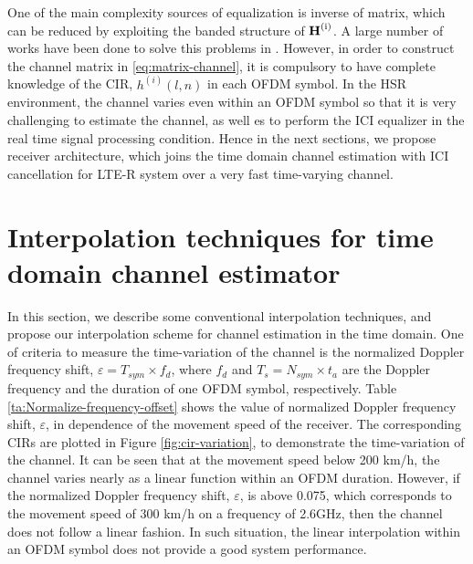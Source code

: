 \documentclass[12pt,journal,draftclsnofoot,onecolumn]{IEEEtran}
\begin{document}
One of the main complexity sources of equalization is inverse of matrix, which can be reduced by exploiting  the banded structure of $\rm{\textbf H^{(i)}}$. A large number of works have been done to solve this problems in \cite{Hsu2009, Liu2012, Schniter2004, Fang2007}. However, in order to construct the channel matrix in \eqref{eq:matrix-channel}, it is compulsory to have complete knowledge of the CIR, $h^{(i)}(l,n)$ in each OFDM symbol. In the HSR environment, the channel varies even within an OFDM symbol so that it is very challenging to estimate the channel, as well es to perform the ICI equalizer in the real time signal processing condition. Hence in the next sections, we propose receiver architecture, which joins the  time domain channel estimation with ICI cancellation for LTE-R system over a very fast time-varying channel.
	
\section{Interpolation techniques for time domain channel estimator}\label{section-3}
	
In this section, we describe some conventional interpolation techniques, and propose our interpolation scheme for channel estimation in the time domain. One of criteria to measure the time-variation of the channel is the normalized Doppler frequency shift, $\varepsilon = T_{sym}\times f_{d}$, where $f_{d}$ and $T_{s}=N_{sym}\times t_{a}$ are the Doppler frequency and the duration of one OFDM symbol, respectively. Table \ref{ta:Normalize-frequency-offset} shows the value of normalized Doppler frequency shift, $\varepsilon$, in dependence of the movement speed of the receiver. The corresponding CIRs are plotted in Figure \ref{fig:cir-variation}, to demonstrate the time-variation of the channel. It can be seen that at the movement speed below 200 km/h, the channel varies nearly as a linear function  within an OFDM duration. However,  if the normalized Doppler frequency shift, $\varepsilon$, is above 0.075, which corresponds to the movement speed of 300 km/h on a frequency of 2.6GHz, then the channel does not follow a linear fashion. In such situation, the linear interpolation within an OFDM symbol does not provide a good system performance.
	
\end{document}
